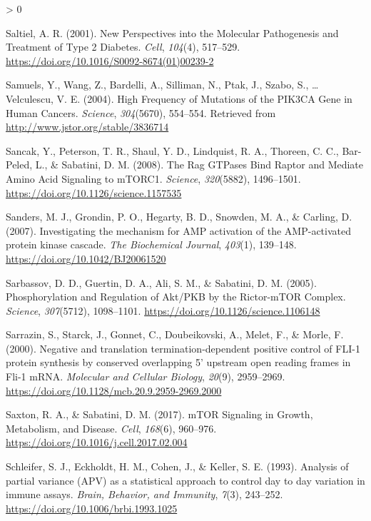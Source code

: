 \documentclass[
  12pt,
  openany]{book}
\newlength{\cslhangindent}
\newenvironment{CSLReferences}[2] %
 {%
  \setlength{\parindent}{0pt}
  \ifodd #1 \everypar{\setlength{\hangindent}{\cslhangindent}}\ignorespaces\fi
  \ifnum #2 > 0
  \setlength{\parskip}{#2\baselineskip}
  \fi
 }%
 {}
\begin{document}
\begin{CSLReferences}{1}{0}
\leavevmode\hypertarget{ref-Saltiel2001}{}%
Saltiel, A. R. (2001). New {Perspectives} into the {Molecular Pathogenesis} and {Treatment} of {Type} 2 {Diabetes}. \emph{Cell}, \emph{104}(4), 517--529. \url{https://doi.org/10.1016/S0092-8674(01)00239-2}

\leavevmode\hypertarget{ref-Samuels2004}{}%
Samuels, Y., Wang, Z., Bardelli, A., Silliman, N., Ptak, J., Szabo, S., \ldots{} Velculescu, V. E. (2004). High {Frequency} of {Mutations} of the {PIK3CA Gene} in {Human Cancers}. \emph{Science}, \emph{304}(5670), 554--554. Retrieved from \url{http://www.jstor.org/stable/3836714}

\leavevmode\hypertarget{ref-Sancak2008}{}%
Sancak, Y., Peterson, T. R., Shaul, Y. D., Lindquist, R. A., Thoreen, C. C., Bar-Peled, L., \& Sabatini, D. M. (2008). The {Rag GTPases Bind Raptor} and {Mediate Amino Acid Signaling} to {mTORC1}. \emph{Science}, \emph{320}(5882), 1496--1501. \url{https://doi.org/10.1126/science.1157535}

\leavevmode\hypertarget{ref-Sanders2007}{}%
Sanders, M. J., Grondin, P. O., Hegarty, B. D., Snowden, M. A., \& Carling, D. (2007). Investigating the mechanism for {AMP} activation of the {AMP}-activated protein kinase cascade. \emph{The Biochemical Journal}, \emph{403}(1), 139--148. \url{https://doi.org/10.1042/BJ20061520}

\leavevmode\hypertarget{ref-Sarbassov2005}{}%
Sarbassov, D. D., Guertin, D. A., Ali, S. M., \& Sabatini, D. M. (2005). Phosphorylation and {Regulation} of {Akt}/{PKB} by the {Rictor}-{mTOR Complex}. \emph{Science}, \emph{307}(5712), 1098--1101. \url{https://doi.org/10.1126/science.1106148}

\leavevmode\hypertarget{ref-Sarrazin2000}{}%
Sarrazin, S., Starck, J., Gonnet, C., Doubeikovski, A., Melet, F., \& Morle, F. (2000). Negative and translation termination-dependent positive control of {FLI}-1 protein synthesis by conserved overlapping 5' upstream open reading frames in {Fli}-1 {mRNA}. \emph{Molecular and Cellular Biology}, \emph{20}(9), 2959--2969. \url{https://doi.org/10.1128/mcb.20.9.2959-2969.2000}

\leavevmode\hypertarget{ref-Saxton2017}{}%
Saxton, R. A., \& Sabatini, D. M. (2017). {mTOR Signaling} in {Growth}, {Metabolism}, and {Disease}. \emph{Cell}, \emph{168}(6), 960--976. \url{https://doi.org/10.1016/j.cell.2017.02.004}

\leavevmode\hypertarget{ref-Schleifer1993}{}%
Schleifer, S. J., Eckholdt, H. M., Cohen, J., \& Keller, S. E. (1993). Analysis of partial variance ({APV}) as a statistical approach to control day to day variation in immune assays. \emph{Brain, Behavior, and Immunity}, \emph{7}(3), 243--252. \url{https://doi.org/10.1006/brbi.1993.1025}


\end{CSLReferences}
\end{document}
